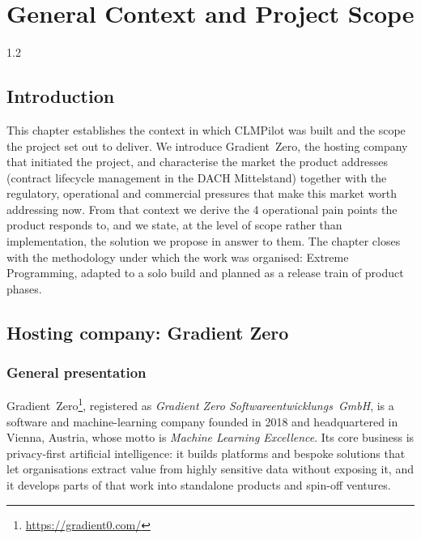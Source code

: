 \chapter{General Context and Project Scope}
\label{chap:context}

\graphicspath{{Chapter1/figures/}}
\pagestyle{fancy}
\fancyhf{}
\fancyfoot[R]{\thepage}
\renewcommand{\headrulewidth}{0.5pt}
\renewcommand{\footrulewidth}{0pt}

\begin{spacing}{1.2}

\section*{Introduction}
This chapter establishes the context in which CLMPilot was built and the
scope the project set out to deliver. We introduce Gradient~Zero, the
hosting company that initiated the project, and characterise the market
the product addresses (contract lifecycle management in the DACH
Mittelstand) together with the regulatory, operational and commercial
pressures that make this market worth addressing now. From that context we
derive the 4 operational pain points the product responds to, and we
state, at the level of scope rather than implementation, the solution we
propose in answer to them. The chapter closes with the methodology under
which the work was organised: Extreme Programming, adapted to a solo
build and planned as a release train of product phases.

\section{Hosting company: Gradient Zero}
\label{sec:gradient-zero}

\subsection{General presentation}
Gradient~Zero\footnote{\url{https://gradient0.com/}}, registered as
\textit{Gradient Zero Softwareentwicklungs~GmbH}, is a software and
machine-learning company founded in 2018 and headquartered in Vienna,
Austria, whose motto is \textit{Machine Learning Excellence}.
Its core business is privacy-first artificial intelligence: it builds
platforms and bespoke solutions that let organisations extract value from
highly sensitive data without exposing it, and it develops parts of that work
into standalone products and spin-off ventures.


\end{spacing}
